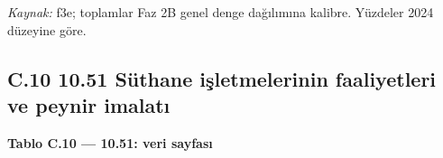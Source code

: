 \endgroup

\emph{Kaynak:} \etiketT{} f3e; toplamlar Faz 2B genel denge dağılımına kalibre. Yüzdeler 2024 düzeyine göre.

\hypertarget{nace_kartlar_10-12-c10-1051-suxfcthane-iux15fletmelerinin-faaliyetleri-ve-peynir-imalatux131}{%
\subsection{C.10 10.51 Süthane işletmelerinin faaliyetleri ve peynir imalatı}\label{nace_kartlar_10-12-c10-1051-suxfcthane-iux15fletmelerinin-faaliyetleri-ve-peynir-imalatux131}}


\textbf{Tablo C.10 --- 10.51: veri sayfası}

\nopagebreak[4]

\begingroup\gbtablo\small

